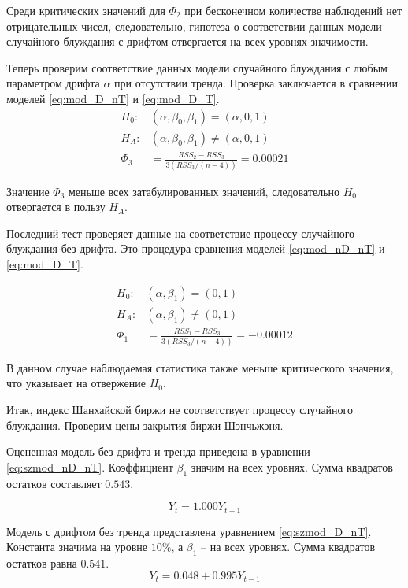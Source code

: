 \documentclass[a4paper,12pt]{article}
\begin{document}
Среди критических значений для $\Phi_2$ при бесконечном количестве наблюдений нет отрицательных чисел, следовательно, гипотеза о соответствии данных модели случайного блуждания с дрифтом отвергается на всех уровнях значимости.

Теперь проверим соответствие данных модели случайного блуждания с любым параметром дрифта $\alpha$ при отсутствии тренда. Проверка заключается в сравнении моделей \ref{eq:mod_D_nT} и \ref{eq:mod_D_T}.
\begin{align}
  H_0:& (\alpha,\beta_0,\beta_1)=(\alpha,0,1)\\
  H_A:& (\alpha,\beta_0,\beta_1)\neq(\alpha,0,1)\\
  \Phi_3&=\frac{RSS_2-RSS_3}{3(RSS_3/(n-4))}=0.00021
\end{align}

Значение $\Phi_3$ меньше всех затабулированных значений, следовательно $H_0$ отвергается в пользу $H_A$.

Последний тест проверяет данные на соответствие процессу случайного блуждания без дрифта. Это процедура сравнения моделей \ref{eq:mod_nD_nT} и \ref{eq:mod_D_T}.

\begin{align}
  H_0:& (\alpha,\beta_1)=(0,1)\\
  H_A:& (\alpha,\beta_1)\neq(0,1)\\
  \Phi_1&=\frac{RSS_1-RSS_3}{3(RSS_3/(n-4))}=-0.00012
\end{align}

В данном случае наблюдаемая статистика также меньше критического значения, что указывает на отвержение $H_0$.

Итак, индекс Шанхайской биржи не соответствует процессу случайного блуждания. Проверим цены закрытия биржи Шэнчьжэня.

Оцененная модель без дрифта и тренда приведена в уравнении \ref{eq:szmod_nD_nT}. Коэффициент $\beta_1$ значим на всех уровнях. Сумма квадратов остатков составляет $0.543$.

\begin{equation}
  \label{eq:szmod_nD_nT}
  Y_t=1.000Y_{t-1}
\end{equation}

Модель с дрифтом без тренда представлена уравнением \ref{eq:szmod_D_nT}. Константа значима на уровне $10\%$, а $\beta_1$ -- на всех уровнях. Сумма квадратов остатков равна $0.541$.
\begin{equation}
  \label{eq:szmod_D_nT}
  Y_t=0.048+0.995Y_{t-1}
\end{equation}
\end{document}
